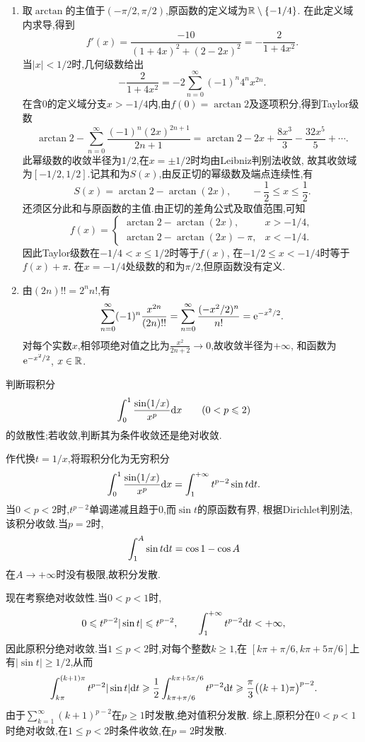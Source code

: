 \documentclass{ctexart}
\begin{document}
\begin{solution}
\begin{enumerate}[label=\tbf{(\arabic*)},topsep=0pt,parsep=0pt,itemsep=0pt,partopsep=0pt]
\item 取$\arctan$的主值于$(-\pi/2,\pi/2)$,原函数的定义域为$\mathbb{R}\setminus\{-1/4\}$.
在此定义域内求导,得到
\[f'(x)=\frac{-10}{(1+4x)^2+(2-2x)^2}=-\frac2{1+4x^2}.\]
当$|x|<1/2$时,几何级数给出
\[-\frac2{1+4x^2}=-2\sum_{n=0}^{\infty}(-1)^n4^nx^{2n}.\]
在含$0$的定义域分支$x>-1/4$内,由$f(0)=\arctan2$及逐项积分,得到Taylor级数
\[\arctan2-\sum_{n=0}^{\infty}\frac{(-1)^n(2x)^{2n+1}}{2n+1}
=\arctan2-2x+\frac{8x^3}{3}-\frac{32x^5}{5}+\cdots.\]
此幂级数的收敛半径为$1/2$,在$x=\pm1/2$时均由Leibniz判别法收敛,
故其收敛域为$[-1/2,1/2]$.记其和为$S(x)$,由反正切的幂级数及端点连续性,有
\[S(x)=\arctan2-\arctan(2x),\qquad-\frac12\leqslant x\leqslant\frac12.\]
还须区分此和与原函数的主值.由正切的差角公式及取值范围,可知
\[f(x)=\begin{cases}
\arctan2-\arctan(2x),&x>-1/4,\\
\arctan2-\arctan(2x)-\pi,&x<-1/4.
\end{cases}\]
因此Taylor级数在$-1/4<x\leqslant1/2$时等于$f(x)$,
在$-1/2\leqslant x<-1/4$时等于$f(x)+\pi$.
在$x=-1/4$处级数的和为$\pi/2$,但原函数没有定义.
\item 由$(2n)!!=2^nn!$,有
\[\sum_{n=0}^{\infty}(-1)^n\frac{x^{2n}}{(2n)!!}
=\sum_{n=0}^{\infty}\frac{(-x^2/2)^n}{n!}=\mathrm{e}^{-x^2/2}.\]
对每个实数$x$,相邻项绝对值之比为$\frac{x^2}{2n+2}\to0$,故收敛半径为$+\infty$,
和函数为$\mathrm{e}^{-x^2/2}$, $x\in\mathbb{R}$.
\end{enumerate}
\end{solution}
\begin{problem}[4.(15\songti{分})]
判断瑕积分
\[\int_0^1\frac{\sin(1/x)}{x^p}\mathrm{d} x\qquad(0<p\leqslant2)\]
的敛散性;若收敛,判断其为条件收敛还是绝对收敛.
\end{problem}
\begin{solution}
作代换$t=1/x$,将瑕积分化为无穷积分
\[\int_0^1\frac{\sin(1/x)}{x^p}\mathrm{d} x
=\int_1^{+\infty}t^{p-2}\sin t\mathrm{d} t.\]
当$0<p<2$时,$t^{p-2}$单调递减且趋于$0$,而$\sin t$的原函数有界,
根据Dirichlet判别法,该积分收敛.当$p=2$时,
\[\int_1^A\sin t\mathrm{d} t=\cos1-\cos A\]
在$A\to+\infty$时没有极限,故积分发散.

现在考察绝对收敛性.当$0<p<1$时,
\[0\leqslant t^{p-2}|\sin t|\leqslant t^{p-2},\qquad
\int_1^{+\infty}t^{p-2}\mathrm{d} t<+\infty,\]
因此原积分绝对收敛.当$1\leqslant p<2$时,对每个整数$k\geqslant1$,在
$[k\pi+\pi/6,k\pi+5\pi/6]$上有$|\sin t|\geqslant1/2$,从而
\[\int_{k\pi}^{(k+1)\pi}t^{p-2}|\sin t|\mathrm{d} t
\geqslant\frac12\int_{k\pi+\pi/6}^{k\pi+5\pi/6}t^{p-2}\mathrm{d} t
\geqslant\frac\pi3\big((k+1)\pi\big)^{p-2}.\]
由于$\sum_{k=1}^{\infty}(k+1)^{p-2}$在$p\geqslant1$时发散,绝对值积分发散.
综上,原积分在$0<p<1$时绝对收敛,在$1\leqslant p<2$时条件收敛,在$p=2$时发散.
\end{solution}
\end{document}
